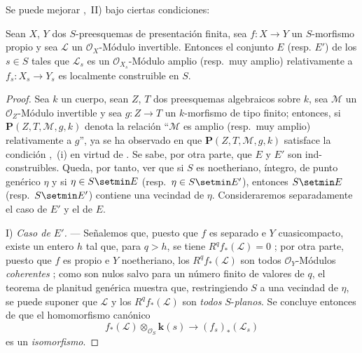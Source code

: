 Se puede mejorar ,~II) bajo ciertas condiciones:

\begin{proposition}[9.6.3]
\label{IV.9.6.3}
Sean $X$, $Y$ dos $S$-preesquemas de presentación finita, sea $f:X\to Y$ un $S$-morfismo \textup{propio} y sea $\mathcal L$ un $\mathcal O_X$-Módulo invertible.
Entonces el conjunto $E$ \textup{(resp.} $E'$\textup{)} de los $s\in S$ tales que $\mathcal L_s$ es un $\mathcal O_{X_s}$-Módulo amplio \textup{(resp.}\ muy amplio\textup{)} relativamente a $f_s:X_s\to Y_s$ es localmente construible en $S$.
\end{proposition}

\begin{proof}
Sea $k$ un cuerpo, sean $Z$, $T$ dos preesquemas algebraicos sobre $k$, sea $\mathcal M$ un $\mathcal O_Z$-Módulo invertible y sea $g:Z\to T$ un $k$-morfismo de tipo finito; entonces, si $\boldsymbol{P}(Z,T,\mathcal M,g,k)$ denota la relación ``$\mathcal M$ es amplio (resp.\ muy amplio) relativamente a $g$'', ya se ha observado en  que $\boldsymbol{P}(Z,T,\mathcal M,g,k)$ satisface la condición ,~(i) en virtud de .
Se sabe, por otra parte, que $E$ y $E'$ son ind-construibles.
Queda, por tanto, ver que si $S$ es noetheriano, íntegro, de punto genérico $\eta$ y si $\eta\in S\setmin E$ (resp.\ $\eta\in S\setmin E'$), entonces $S\setmin E$ (resp.\ $S\setmin E'$) contiene una vecindad de $\eta$.
Consideraremos separadamente el caso de $E'$ y el de $E$.

I) \emph{Caso de $E'$.} --- Señalemos que, puesto que $f$ es separado e $Y$
cuasicompacto, existe un entero $h$ tal que, para $q>h$, se tiene
$R^qf_*(\mathcal L)=0$ ; por otra parte, puesto que $f$ es
propio e $Y$ noetheriano, los $R^qf_*(\mathcal L)$ son todos
$\mathcal O_Y$-Módulos \emph{coherentes} ; como son nulos
salvo para un número finito de valores de $q$, el teorema de planitud genérica
 muestra que, restringiendo $S$ a una vecindad de $\eta$, se puede
suponer que $\mathcal L$ y los $R^qf_*(\mathcal L)$ son \emph{todos} $S$-\emph{planos}. Se
concluye entonces de  que el homomorfismo canónico
\begin{equation}
\label{IV.9.6.3.1-fr}
 f_*(\mathcal L)\otimes_{\mathcal O_S} \boldsymbol{k}(s)
 \longrightarrow (f_s)_*(\mathcal L_s)
 \tag{9.6.3.1}
\end{equation}
es un \emph{isomorfismo}.



\end{proof}
